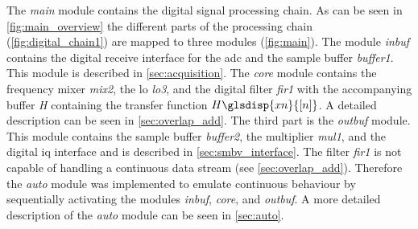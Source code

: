 \documentclass[12pt,a4paper,parskip=full,abstract=true,BCOR=12mm]{scrreprt}
\def\device#1{\mbox{\textit{#1}}}
\newcommand{\XN}{\glsdisp{xn}{[n]}}
\begin{document}
The \device{main} module contains the digital signal processing chain. As can be seen
in \cref{fig:main_overview} the different parts of the processing chain (\cref{fig:digital_chain1}) are mapped
to three modules (\cref{fig:main}). The module \device{inbuf} contains the digital receive interface
for the \gls{adc} and the sample buffer \device{buffer1}. This module is described
in \cref{sec:acquisition}. The \device{core} module contains the frequency
mixer \device{mix2}, the \gls{lo} \device{lo3}, and the digital filter \device{fir1} with
the accompanying buffer \device{H} containing the transfer function $H\XN$.
A detailed description can be seen in \cref{sec:overlap_add}. The third part
is the \device{outbuf} module. This module contains the sample buffer \device{buffer2},
the multiplier \device{mul1}, and the digital \gls{iq} interface and is described in \cref{sec:smbv_interface}. The
filter \device{fir1} is not capable of handling a continuous data stream (see
\cref{sec:overlap_add}). Therefore the \device{auto} module was implemented to emulate
continuous behaviour by sequentially activating the modules \device{inbuf}, \device{core},
and \device{outbuf}. A more detailed description of the \device{auto} module can be seen
in \cref{sec:auto}.
\end{document}
